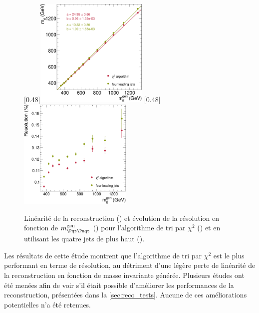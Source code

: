 \begin{figure}[tbp] \centering
    \subcaptionbox{\label{fig:mtt_response_chi2_vs_four_jets}}[0.48\textwidth]{\includegraphics[width=0.48\textwidth]{chapitre6/figs/mtt_response_vs_gen_comparison_chi2_four_jets.pdf}}\hfill
    \subcaptionbox{\label{fig:mtt_reso_vs_mtt_gen_chi2_vs_four_jets}}[0.48\textwidth]{\includegraphics[width=0.48\textwidth]{chapitre6/figs/mtt_resolution_vs_gen_comparison_chi2_four_jets.pdf}}
    \caption{Linéarité de la reconstruction () et évolution de la résolution en fonction de $\mtt^\text{gen}$ () pour l'algorithme de tri par $\chi^2$ (\rouge) et en utilisant les quatre jets de plus haut \pt (\vertc).}
    \label{fig:mtt_reso_chi2_vs_four_jets}
\end{figure}

\bigskip

Les résultats de cette étude montrent que l'algorithme de tri par $\chi^2$ est le plus performant en terme de résolution, au détriment d'une légère perte de linéarité de la reconstruction en fonction de masse invariante générée. Plusieurs études ont été menées afin de voir s'il était possible d'améliorer les performances de la reconstruction, présentées dans la \cref{sec:reco_tests}. Aucune de ces améliorations potentielles n'a été retenues.

